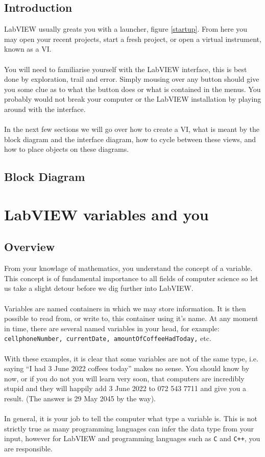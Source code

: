 	\subsection{Introduction}
	LabVIEW usually greats you with a launcher, figure \ref{startup}. From here you may open your recent projects, start a fresh project, or open a virtual instrument, known as a VI.\\ %
	\\
	You will need to familiarise yourself with the LabVIEW interface, this is best done by exploration, trail and error. Simply mousing over any button should give you some clue as to what the button does or what is contained in the menus. You probably would not break your computer or the LabVIEW installation by playing around with the interface.\\
	\\
	In the next few sections we will go over how to create a VI, what is meant by the block diagram and the interface diagram, %
	how to cycle between these views, and how to place objects on these diagrams.
	\subsection{Block Diagram}
	
	\section{LabVIEW variables and you}
	\subsection{Overview}
	From your knowlage of mathematics, you understand the concept of a variable. This concept is of fundamental importance to all fields of computer science so let us take a slight detour before we dig further into LabVIEW.\\
	\\
	Variables are named containers in which we may store information. It is then possible to read from, or write to, this container using it's name. At any moment in time, there are several named variables in your head, for example: \texttt{cellphoneNumber, currentDate, amountOfCoffeeHadToday,} etc.\\
	\\
	With these examples, it is clear that some variables are not of the same type, i.e. saying ``I had 3 June 2022 coffees today'' makes no sense. You should know by now, or if you do not you will learn very soon, that computers are incredibly stupid and they will happily add 3 June 2022 to 072 543 7711 and give you a result. (The answer is 29 May 2045 by the way).\\
	\\
	In general, it is your job to tell the computer what type a variable is. This is not strictly true as many programming languages can infer the data type from your input, however for LabVIEW and programming languages such as \texttt{C} and \texttt{C++}, you are responsible.
